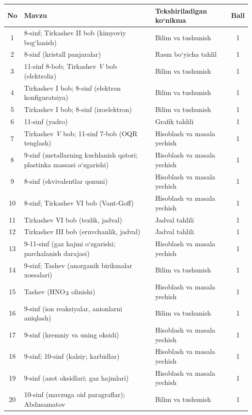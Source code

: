 \documentclass[11pt,a4paper]{article}
\renewcommand{\textsubscript}[1]{\ensuremath{_{\text{\fontsize{8}{8}\selectfont #1}}}}
\begin{document}
{\small\noindent\begin{longtable}{|c|p{7.2cm}|p{5.4cm}|c|}\hline \textbf{No} & \textbf{Mavzu} & \textbf{Tekshiriladigan ko`nikma} & \textbf{Ball}\\\hline
1 & 8-sinf; Tirkashev II bob (kimyoviy bog`lanish) & Bilim va tushunish & 1\\\hline
2 & 8-sinf (kristall panjaralar) & Rasm bo`yicha tahlil & 1\\\hline
3 & 11-sinf 8-bob; Tirkashev \textit{V} bob (elektroliz) & Bilim va tushunish & 1\\\hline
4 & Tirkashev I bob; 8-sinf (elektron konfiguratsiya) & Bilim va tushunish & 1\\\hline
5 & Tirkashev I bob; 8-sinf (izoelektron) & Bilim va tushunish & 1\\\hline
6 & 11-sinf (yadro) & Grafik tahlili & 1\\\hline
7 & Tirkashev \textit{V} bob; 11-sinf 7-bob (OQR tenglash) & Hisoblash va masala yechish & 1\\\hline
8 & 9-sinf (metallarning kuchlanish qatori; plastinka massasi o`zgarishi) & Hisoblash va masala yechish & 1\\\hline
9 & 8-sinf (ekvivalentlar qonuni) & Hisoblash va masala yechish & 1\\\hline
10 & 8-sinf; Tirkashev VI bob (Vant-Goff) & Hisoblash va masala yechish & 1\\\hline
11 & Tirkashev VI bob (tezlik, jadval) & Jadval tahlili & 1\\\hline
12 & Tirkashev III bob (eruvchanlik, jadval) & Jadval tahlili & 1\\\hline
13 & 9-11-sinf (gaz hajmi o`zgarishi; parchalanish darajasi) & Hisoblash va masala yechish & 1\\\hline
14 & 9-sinf; Tashev (anorganik birikmalar xossalari) & Bilim va tushunish & 1\\\hline
15 & Tashev (HNO\textsubscript{3} olinishi) & Hisoblash va masala yechish & 1\\\hline
16 & 9-sinf (ion reaksiyalar, anionlarni aniqlash) & Bilim va tushunish & 1\\\hline
17 & 9-sinf (kremniy va uning oksidi) & Hisoblash va masala yechish & 1\\\hline
18 & 9-sinf; 10-sinf (kalsiy; karbidlar) & Hisoblash va masala yechish & 1\\\hline
19 & 9-sinf (azot oksidlari; gaz hajmlari) & Hisoblash va masala yechish & 1\\\hline
20 & 10-sinf (mavzuga oid paragraflar); Abdusamatov & Bilim va tushunish & 1\\\hline

\end{longtable}}
\end{document}
